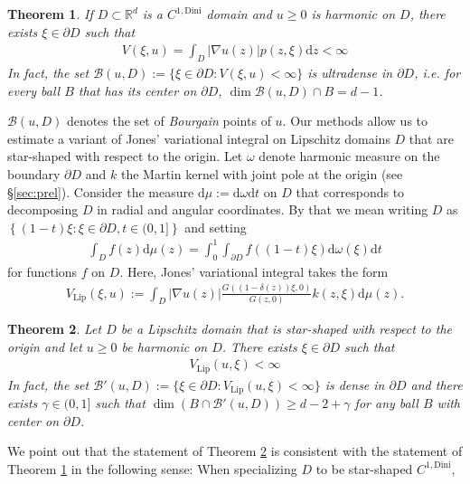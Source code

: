\documentclass[a4paper,12pt]{article}
\newtheorem{theorem}{Theorem}[section]
\theoremstyle{definition}
\theoremstyle{definition}
\begin{document}
	\begin{theorem}\label{thm:MainThm1}
		If $D\subset\mathbb R^d$ is a $C^{1,\mathrm{Dini}}$ domain and $u\geq0$ is harmonic on $D$, there exists $\xi\in\partial D$ such that 
		\begin{align}\label{eq:FullVar}
			V(\xi,u)=\int_D|\nabla u(z)|p(z,\xi)\mathrm{d}z<\infty
		\end{align}
		In fact, the set $\mathcal B(u, D):=\lbrace\xi\in\partial D: V(\xi,u)<\infty\rbrace$ is ultradense in $\partial D$, i.e. for every ball $B$ that has its center on $\partial D$, $\dim \mathcal{B}(u,D)\cap B=d-1$.	
	\end{theorem}
 	$\mathcal{B}(u, D)$ denotes the set of \textit{Bourgain} points of $u$. Our methods allow us to estimate a variant of Jones' variational integral on Lipschitz domains $D$ that are star-shaped with respect to the origin. Let $\omega$ denote harmonic measure on the boundary $\partial D$ and $k$ the Martin kernel with joint pole at the origin (see §\ref{sec:prel}). Consider the measure $\mathrm d\mu:=\mathrm d\omega\mathrm dt$ on $D$ that corresponds to decomposing $D$ in radial and angular coordinates. By that we mean writing $D$ as $\left\lbrace (1-t)\xi:\xi\in\partial D,t\in(0,1]\right\rbrace$ and setting
	\begin{align*}
		\int_D f(z)\mathrm d\mu(z)=\int_0^1\int_{\partial D} f((1-t)\xi)\mathrm d\omega(\xi)\mathrm dt
	\end{align*}
	for functions $f$ on $D$. Here, Jones' variational integral takes the form
	\begin{align}\label{eq:FullVarLip}
		V_{\mathrm{Lip}}(\xi,u):=\int_D|\nabla u(z)|\frac{G((1-\delta(z))\xi,0)}{G(z,0)}k(z,\xi)\mathrm{d}\mu(z).
	\end{align}
	\begin{theorem}\label{thm:MainThmLip}
		Let $D$ be a Lipschitz domain that is star-shaped with respect to the origin and let $u\geq0$ be harmonic on $D$. There exists $\xi\in\partial D$ such that 
		\begin{align*}
			V_{\mathrm{Lip}}(u,\xi)<\infty
		\end{align*}
		In fact, the set $\mathcal B'(u, D):=\lbrace\xi\in\partial D: V_{\mathrm{Lip}}(u,\xi)<\infty\rbrace$ is dense in $\partial D$ and there exists $\gamma\in(0,1]$ such that $\dim(B\cap\mathcal B'(u,D))\geq d-2+\gamma$ for any ball $B$ with center on $\partial D$.
	\end{theorem}
	We point out that the statement of Theorem \ref{thm:MainThmLip} is consistent with the statement of Theorem \ref{thm:MainThm1} in the following sense: When specializing $D$ to be star-shaped $C^{1,\mathrm{Dini}}$, 
\end{document}
